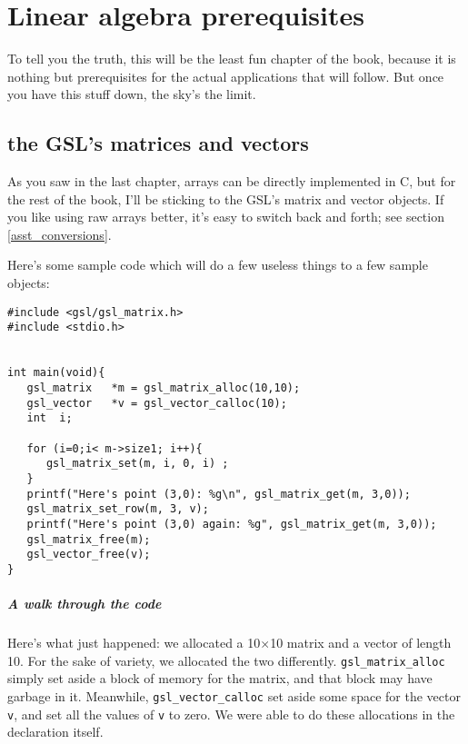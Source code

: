 \chapter{Linear algebra prerequisites} \label{linear_algebra}

To tell you the truth, this will be the least fun chapter of the book,
because it is nothing but prerequisites for the actual applications that
will follow. But once you have this stuff down, the sky's the limit. 

\section{the GSL's matrices and vectors}
As you saw in the last chapter, arrays can be directly implemented in C, but for
the rest of the book, I'll be sticking to the GSL's matrix and vector objects.
If you like using raw arrays better, it's easy to switch back and forth; see
section \ref{asst_conversions}.


Here's some sample code which will do a few useless things to a few sample
objects:
\begin{verbatim}
#include <gsl/gsl_matrix.h>
#include <stdio.h>


int main(void){
   gsl_matrix   *m = gsl_matrix_alloc(10,10);
   gsl_vector   *v = gsl_vector_calloc(10);
   int  i;

   for (i=0;i< m->size1; i++){
      gsl_matrix_set(m, i, 0, i) ;
   }
   printf("Here's point (3,0): %g\n", gsl_matrix_get(m, 3,0));
   gsl_matrix_set_row(m, 3, v);
   printf("Here's point (3,0) again: %g", gsl_matrix_get(m, 3,0));
   gsl_matrix_free(m);
   gsl_vector_free(v);
}
\end{verbatim}

\paragraph{A walk through the code}
Here's what just happened: we allocated a 10$\times$10 matrix and a vector of
length 10.  For the sake of variety, we  allocated the two differently.
{\tt gsl\_matrix\_alloc} simply set aside a block of memory for the matrix,
and that block may have garbage in it. Meanwhile, {\tt gsl\_vector\_calloc} set
aside some space for the vector {\tt v}, and set all the values of {\tt v} to
zero.  We were able to do these allocations in the declaration itself.

